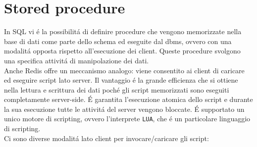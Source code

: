 \section{Stored procedure}
In SQL vi é la possibilitá di definire procedure che vengono memorizzate nella base di dati come parte dello schema ed eseguite dal dbms,
ovvero con una modalitá opposta rispetto all'esecuzione dei client. Queste procedure svolgono una specifica attivitá di manipolazione dei dati.\\
Anche Redis offre un meccanismo analogo: viene consentito ai client di caricare ed eseguire script lato server.
Il vantaggio é la grande efficienza che si ottiene nella lettura e scrittura dei dati poché gli script
memorizzati sono eseguiti completamente server-side.
É garantita l'esecuzione atomica dello script e durante la sua esecuzione tutte le attivitá del server vengono bloccate.
É supportato un unico motore di scripting, ovvero l'interprete \texttt{LUA}, che é un particolare linguaggio di scripting.
\\
Ci sono diverse modalitá lato client per invocare/caricare gli script:
